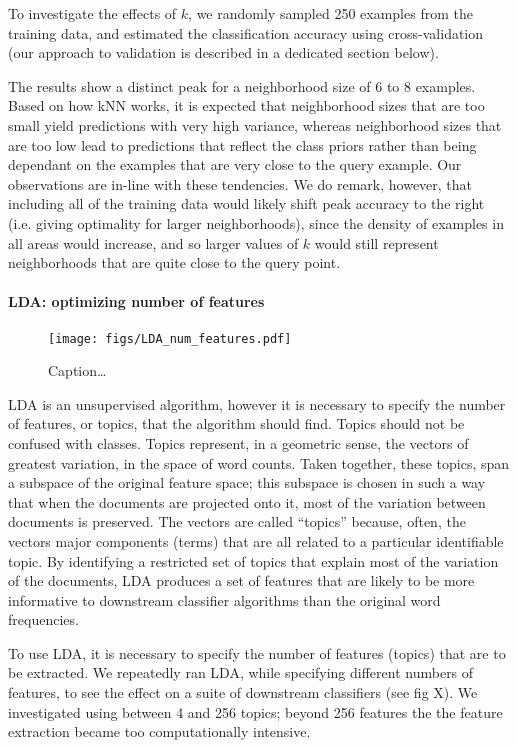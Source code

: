 \documentclass[conference,letterpaper]{IEEEtran}
\begin{document}
To investigate the effects of $k$, we randomly sampled 250 examples from the
training data, and estimated the classification accuracy using 
cross-validation (our approach to validation is described in a dedicated 
section below).  

The results show a distinct peak for a neighborhood size of 6 to 8 examples.
Based on how kNN works, it is expected that neighborhood sizes that are 
too small yield predictions with very high variance, whereas neighborhood 
sizes that are too low lead to predictions that reflect the class priors
rather than being dependant on the examples that are very close to the query 
example.  Our 
observations are in-line with these tendencies.  We do remark, however, that
including all of the training data would likely shift peak accuracy to the
right (i.e. giving optimality for larger neighborhoods), since the density
of examples in all areas would increase, and so larger values of $k$ would 
still represent neighborhoods that are quite close to the query point.

\paragraph*{LDA: optimizing number of features}

\begin{figure}
	\centering
	\texttt{[image: figs/LDA\_num\_features.pdf]}
	\caption{Caption\dots}
	\label{fig:LDA_num_features}
\end{figure}

LDA is an unsupervised algorithm, however it is necessary to specify the 
number of features, or topics, that the algorithm should find.  Topics
should not be confused with classes.  Topics represent, in a geometric sense,
the vectors of greatest variation, in the space of word counts. Taken together,
these topics, span a 
subspace of the original feature space; this subspace is chosen in such a way
that when the documents are projected onto it, most of the variation between
documents is preserved.  The vectors are called ``topics'' because, often, 
the vectors major components (terms) that are all related to a particular 
identifiable topic.  By identifying a restricted set of topics that explain
most of the variation of the documents, LDA produces a set of features that 
are likely to be more informative to downstream classifier algorithms than
the original word frequencies.

To use LDA, it is necessary to specify the number of features (topics) that
are to be extracted.  We repeatedly ran LDA, while specifying different numbers
of features, to see the effect on a suite of downstream classifiers 
(see fig X).  
We investigated using between 4 and 256 topics; beyond 256 features the 
the feature extraction became too computationally intensive.  
\end{document}
